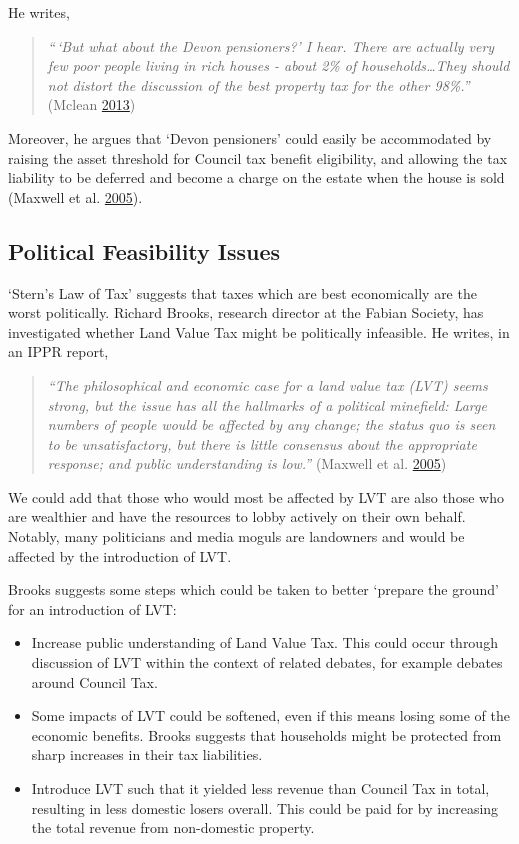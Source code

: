 \documentclass[]{tufte-handout}
\providecommand{\tightlist}{%
  \setlength{\itemsep}{0pt}\setlength{\parskip}{0pt}}
\begin{document}
He writes,

\begin{quote}
\emph{``\,`But what about the Devon pensioners?' I hear. There are
actually very few poor people living in rich houses - about 2\% of
households\ldots{}They should not distort the discussion of the best
property tax for the other 98\%.''} (Mclean
\protect\hyperlink{ref-Mclean2013}{2013})
\end{quote}

Moreover, he argues that `Devon pensioners' could easily be accommodated
by raising the asset threshold for Council tax benefit eligibility, and
allowing the tax liability to be deferred and become a charge on the
estate when the house is sold (Maxwell et al.
\protect\hyperlink{ref-Maxwell}{2005}).

\hypertarget{political-feasibility-issues}{%
\subsection{Political Feasibility
Issues}\label{political-feasibility-issues}}

`Stern's Law of Tax' suggests that taxes which are best economically are
the worst politically. Richard Brooks, research director at the Fabian
Society, has investigated whether Land Value Tax might be politically
infeasible. He writes, in an IPPR report,

\begin{quote}
\emph{``The philosophical and economic case for a land value tax (LVT)
seems strong, but the issue has all the hallmarks of a political
minefield: Large numbers of people would be affected by any change; the
status quo is seen to be unsatisfactory, but there is little consensus
about the appropriate response; and public understanding is low.''}
(Maxwell et al. \protect\hyperlink{ref-Maxwell}{2005})
\end{quote}

We could add that those who would most be affected by LVT are also those
who are wealthier and have the resources to lobby actively on their own
behalf. Notably, many politicians and media moguls are landowners and
would be affected by the introduction of LVT.

Brooks suggests some steps which could be taken to better `prepare the
ground' for an introduction of LVT:

\begin{itemize}
\tightlist
\item
  Increase public understanding of Land Value Tax. This could occur
  through discussion of LVT within the context of related debates, for
  example debates around Council Tax.
\item
  Some impacts of LVT could be softened, even if this means losing some
  of the economic benefits. Brooks suggests that households might be
  protected from sharp increases in their tax liabilities.
\item
  Introduce LVT such that it yielded less revenue than Council Tax in
  total, resulting in less domestic losers overall. This could be paid
  for by increasing the total revenue from non-domestic property.
\end{itemize}
\end{document}
